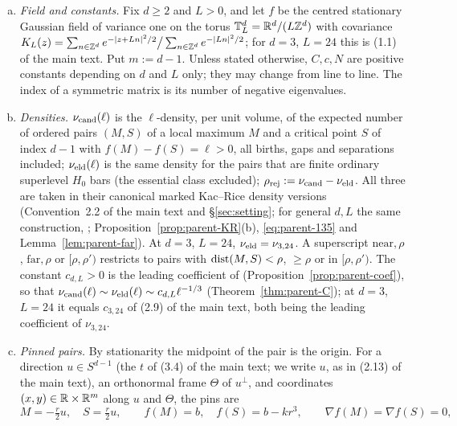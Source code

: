 \begin{convention}\label{conv:remainder-notation}
\begin{enumerate}[(a),leftmargin=2em,itemsep=2pt]
\item \emph{Field and constants.} Fix $d\ge2$ and $L>0$, and let $f$ be the centred stationary Gaussian field of variance one on the torus $\mathbb T^d_L=\mathbb R^d/(L\mathbb Z^d)$ with covariance $K_L(z)=\sum_{n\in\mathbb Z^d}e^{-|z+Ln|^2/2}\big/\sum_{n\in\mathbb Z^d}e^{-|Ln|^2/2}$; for $d=3$, $L=24$ this is (1.1) of the main text. Put $m:=d-1$. Unless stated otherwise, $C,c,N$ are positive constants depending on $d$ and $L$ only; they may change from line to line. The index of a symmetric matrix is its number of negative eigenvalues.
\item \emph{Densities.} $\nu_{\mathrm{cand}}(\ell)$ is the $\ell$-density, per unit volume, of the expected number of ordered pairs $(M,S)$ of a local maximum $M$ and a critical point $S$ of index $d-1$ with $f(M)-f(S)=\ell>0$, all births, gaps and separations included; $\nu_{\mathrm{eld}}(\ell)$ is the same density for the pairs that are finite ordinary superlevel $H_0$ bars (the essential class excluded); $\rho_{\mathrm{rej}}:=\nu_{\mathrm{cand}}-\nu_{\mathrm{eld}}$. All three are taken in their canonical marked Kac--Rice density versions (Convention~2.2 of the main text and \S\ref{sec:setting}; for general $d,L$ the same construction, \cite[\S9]{parentP}; Proposition~\ref{prop:parent-KR}(b), \eqref{eq:parent-135} and Lemma~\ref{lem:parent-far}). At $d=3$, $L=24$, $\nu_{\mathrm{eld}}=\nu_{3,24}$. A superscript $\mathrm{near},\rho$, $\mathrm{far},\rho$ or $[\rho,\rho')$ restricts to pairs with $\operatorname{dist}(M,S)<\rho$, $\ge\rho$ or in $[\rho,\rho')$. The constant $c_{d,L}>0$ is the leading coefficient of \cite[(15.2)]{parentP} (Proposition~\ref{prop:parent-coef}), so that $\nu_{\mathrm{cand}}(\ell)\sim\nu_{\mathrm{eld}}(\ell)\sim c_{d,L}\ell^{-1/3}$ \cite[Theorem~C]{parentP} (Theorem~\ref{thm:parent-C}); at $d=3$, $L=24$ it equals $c_{3,24}$ of (2.9) of the main text, both being the leading coefficient of $\nu_{3,24}$.
\item \emph{Pinned pairs.} By stationarity the midpoint of the pair is the origin. For a direction $u\in S^{d-1}$ (the $t$ of (3.4) of the main text; we write $u$, as in (2.13) of the main text), an orthonormal frame $\Theta$ of $u^\perp$, and coordinates $(x,y)\in\mathbb R\times\mathbb R^m$ along $u$ and $\Theta$, the pins are
\[
M=-\tfrac r2u,\quad S=\tfrac r2u,\qquad f(M)=b,\quad f(S)=b-kr^3,\qquad \nabla f(M)=\nabla f(S)=0,
\]

\end{enumerate}
\end{convention}
